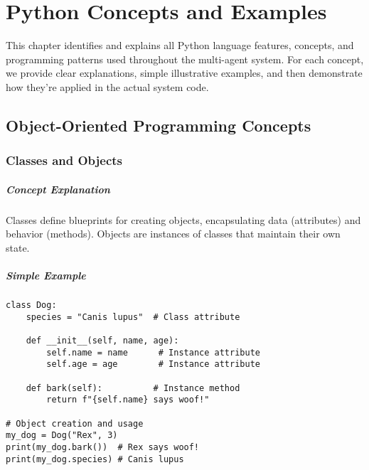 \chapter{Python Concepts and Examples}

This chapter identifies and explains all Python language features, concepts, and programming patterns used throughout the multi-agent system. For each concept, we provide clear explanations, simple illustrative examples, and then demonstrate how they're applied in the actual system code.

\section{Object-Oriented Programming Concepts}

\subsection{Classes and Objects}

\paragraph{Concept Explanation}
Classes define blueprints for creating objects, encapsulating data (attributes) and behavior (methods). Objects are instances of classes that maintain their own state.

\paragraph{Simple Example}
\begin{lstlisting}[caption=Basic Class Concept]
class Dog:
    species = "Canis lupus"  # Class attribute
    
    def __init__(self, name, age):
        self.name = name      # Instance attribute
        self.age = age        # Instance attribute
    
    def bark(self):          # Instance method
        return f"{self.name} says woof!"

# Object creation and usage
my_dog = Dog("Rex", 3)
print(my_dog.bark())  # Rex says woof!
print(my_dog.species) # Canis lupus
\end{lstlisting}

